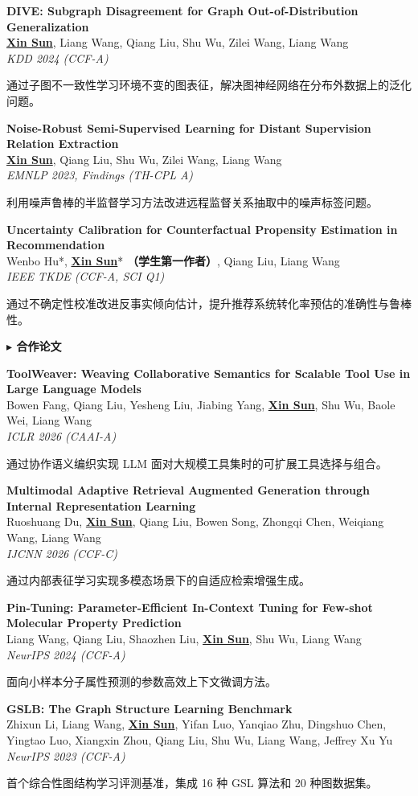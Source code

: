 \documentclass[letterpaper,11pt]{article}
\newcommand{\pubentry}[4]{
  \Needspace{5\baselineskip}
  \item \textbf{#1} \\
  {\small #2} \\
  {\small \textit{#3}\hfill #4}
  \vspace{0pt}
}
\begin{document}
\begin{enumerate}[leftmargin=0.3in, label={[\arabic*]}, itemsep=4pt, parsep=0pt, topsep=4pt]
  \pubentry{DIVE: Subgraph Disagreement for Graph Out-of-Distribution Generalization}
  {\textbf{\underline{Xin Sun}}, Liang Wang, Qiang Liu, Shu Wu, Zilei Wang, Liang Wang}
  {KDD 2024 (CCF-A)}{}
  {\small\color{secondary} 通过子图不一致性学习环境不变的图表征，解决图神经网络在分布外数据上的泛化问题。}

  \pubentry{Noise-Robust Semi-Supervised Learning for Distant Supervision Relation Extraction}
  {\textbf{\underline{Xin Sun}}, Qiang Liu, Shu Wu, Zilei Wang, Liang Wang}
  {EMNLP 2023, Findings (TH-CPL A)}{}
  {\small\color{secondary} 利用噪声鲁棒的半监督学习方法改进远程监督关系抽取中的噪声标签问题。}

  \pubentry{Uncertainty Calibration for Counterfactual Propensity Estimation in Recommendation}
  {Wenbo Hu*, \textbf{\underline{Xin Sun}}* \textbf{（学生第一作者）}, Qiang Liu, Liang Wang}
  {IEEE TKDE (CCF-A, SCI Q1)}{}
  {\small\color{secondary} 通过不确定性校准改进反事实倾向估计，提升推荐系统转化率预估的准确性与鲁棒性。}

\end{enumerate}

\vspace{2pt}
\textbf{\color{primary} $\blacktriangleright$ \quad 合作论文}
\begin{enumerate}[leftmargin=0.3in, label={[\arabic*]}, resume, itemsep=4pt, parsep=0pt, topsep=4pt]

  \pubentry{ToolWeaver: Weaving Collaborative Semantics for Scalable Tool Use in Large Language Models}
  {Bowen Fang, Qiang Liu, Yesheng Liu, Jiabing Yang, \textbf{\underline{Xin Sun}}, Shu Wu, Baole Wei, Liang Wang}
  {ICLR 2026 (CAAI-A)}{}
  {\small\color{secondary} 通过协作语义编织实现 LLM 面对大规模工具集时的可扩展工具选择与组合。}

  \pubentry{Multimodal Adaptive Retrieval Augmented Generation through Internal Representation Learning}
  {Ruoshuang Du, \textbf{\underline{Xin Sun}}, Qiang Liu, Bowen Song, Zhongqi Chen, Weiqiang Wang, Liang Wang}
  {IJCNN 2026 (CCF-C)}{}
  {\small\color{secondary} 通过内部表征学习实现多模态场景下的自适应检索增强生成。}

  \pubentry{Pin-Tuning: Parameter-Efficient In-Context Tuning for Few-shot Molecular Property Prediction}
  {Liang Wang, Qiang Liu, Shaozhen Liu, \textbf{\underline{Xin Sun}}, Shu Wu, Liang Wang}
  {NeurIPS 2024 (CCF-A)}{}
  {\small\color{secondary} 面向小样本分子属性预测的参数高效上下文微调方法。}

  \pubentry{GSLB: The Graph Structure Learning Benchmark}
  {Zhixun Li, Liang Wang, \textbf{\underline{Xin Sun}}, Yifan Luo, Yanqiao Zhu, Dingshuo Chen, Yingtao Luo, Xiangxin Zhou, Qiang Liu, Shu Wu, Liang Wang, Jeffrey Xu Yu}
  {NeurIPS 2023 (CCF-A)}{}
  {\small\color{secondary} 首个综合性图结构学习评测基准，集成 16 种 GSL 算法和 20 种图数据集。}

\end{enumerate}
\end{document}
